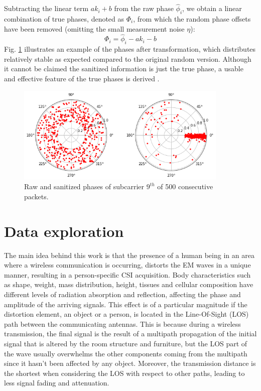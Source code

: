 \documentclass[binding=0.7cm, oneside]{sapthesis}
\begin{document}
Subtracting the linear term $ak_i + b$ from the raw phase $\hat{\phi}_i$, we obtain a linear combination of true phases, denoted as $\Phi_i$, from which the random phase offsets have been removed (omitting the small measurement noise $\eta$):
$$\Phi_i = \hat{\phi}_i - ak_i - b $$
Fig. \ref{fig:phase_cal} illustrates an example of the phases after transformation, which distributes relatively stable as expected compared to the original random version. Although it cannot be claimed
the sanitized information is just the true phase, a usable and effective feature of the true phases is derived \cite{Phase_cal2}.
\begin{figure}[h]
    \centering
    \includegraphics[width=0.90\textwidth]{images/phaseTransform.png}
    \caption{Raw and sanitized phases of subcarrier $9^{th}$ of 500 consecutive packets.}
    \label{fig:phase_cal}
\end{figure}
\section{Data exploration}
The main idea behind this work is that the presence of a human being in an area where a wireless communication is occurring,
distorts the EM waves in a unique manner, resulting in a person-specific CSI acquisition. Body characteristics such as shape, weight, mass distribution,
height, tissues and cellular composition have different levels of radiation absorption and reflection, affecting the phase and amplitude of the arriving signals.
This effect is of a particular magnitude if the distortion element, an object or a person, is located in the Line-Of-Sight (LOS) path between the communicating antennas.
This is because during a wireless transmission, the final signal is the result of a multipath propagation of the initial signal that is altered by the room structure and furniture,
but the LOS part of the wave usually overwhelms the other components coming from the multipath since it hasn't been affected by any object. Moreover, the transmission distance is the shortest
when considering the LOS with respect to other paths, leading to less signal fading and attenuation.
\end{document}

